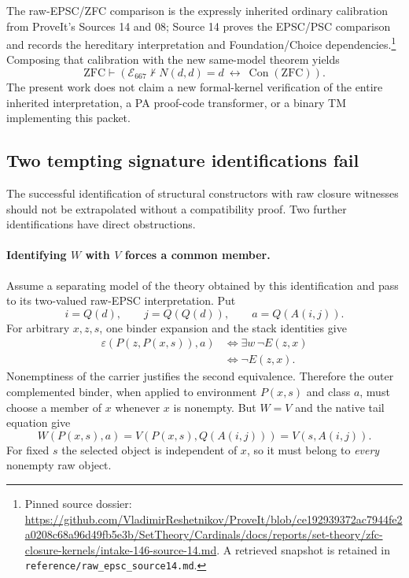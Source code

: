 The raw-EPSC/ZFC comparison is the expressly inherited ordinary
calibration from ProveIt's Sources 14 and 08; Source 14 proves the
EPSC/PSC comparison and records the hereditary interpretation and
Foundation/Choice dependencies.\footnote{Pinned source dossier:
\url{https://github.com/VladimirReshetnikov/ProveIt/blob/ce192939372ac7944fe2a0208c68a96d49fb5e3b/SetTheory/Cardinals/docs/reports/set-theory/zfc-closure-kernels/intake-146-source-14.md}.
A retrieved snapshot is retained in \texttt{reference/raw\_epsc\_source14.md}.}
Composing that calibration with the new same-model theorem yields
\begin{equation}
 \mathrm{ZFC}\vdash
 \left(\mathcal E_{667}\nvdash N(d,d)=d
          \ \longleftrightarrow\ \operatorname{Con}(\mathrm{ZFC})\right).
 \label{eq:e667-calibration}
\end{equation}
The present work does not claim a new formal-kernel verification of
the entire inherited interpretation, a PA proof-code transformer,
or a binary TM implementing this packet.

\subsection{Two tempting signature identifications fail}

The successful identification of structural constructors with raw
closure witnesses should not be extrapolated without a compatibility
proof.  Two further identifications have direct obstructions.

\paragraph{Identifying $W$ with $V$ forces a common member.}
Assume a separating model of the theory obtained by this identification
and pass to its two-valued raw-EPSC interpretation.  Put
\[
 i=Q(d),\qquad j=Q(Q(d)),\qquad a=Q(A(i,j)).
\]
For arbitrary $x,z,s$, one binder expansion and the stack identities give
\begin{align*}
 \varepsilon(P(z,P(x,s)),a)
 &\Longleftrightarrow
   \exists w\,\neg E(z,x)\\
 &\Longleftrightarrow\neg E(z,x).
\end{align*}
Nonemptiness of the carrier justifies the second equivalence.
Therefore the outer complemented binder, when applied to environment
$P(x,s)$ and class $a$, must choose a member of $x$ whenever $x$
is nonempty.  But $W=V$ and the native tail equation give
\[
 W(P(x,s),a)=V(P(x,s),Q(A(i,j)))=V(s,A(i,j)).
\]
For fixed $s$ the selected object is independent of $x$, so it must
belong to \emph{every} nonempty raw object.

